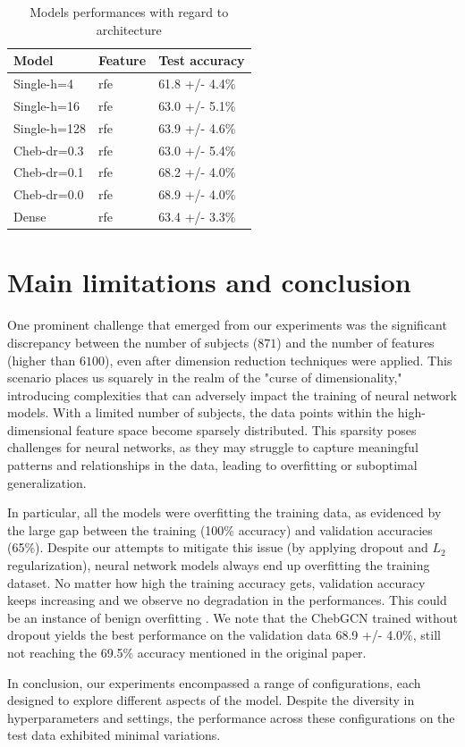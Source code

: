 \begin{table}[H]
	\begin{center}
		\begin{tabular}{lll}
			Model & Feature & Test accuracy \\
			\hline
			Single-h=4 & rfe & 61.8 +/- 4.4\% \\
			Single-h=16 & rfe & 63.0 +/- 5.1\% \\
			Single-h=128 & rfe & 63.9 +/- 4.6\% \\
			Cheb-dr=0.3 & rfe & 63.0 +/- 5.4\% \\
			Cheb-dr=0.1 & rfe & 68.2 +/- 4.0\% \\
			Cheb-dr=0.0 & rfe & 68.9 +/- 4.0\% \\
			Dense & rfe & 63.4 +/- 3.3\% \\
		\end{tabular}
	\end{center}
	\caption{Models performances with regard to architecture}
	\label{table:dependance_on_architecture}
\end{table}




\section{Main limitations and conclusion}


One prominent challenge that emerged from our experiments was the significant discrepancy between the number of subjects ($871$) and the number of features (higher than $6100$), even after dimension reduction techniques were applied. This scenario places us squarely in the realm of the "curse of dimensionality," introducing complexities that can adversely impact the training of neural network models. With a limited number of subjects, the data points within the high-dimensional feature space become sparsely distributed. This sparsity poses challenges for neural networks, as they may struggle to capture meaningful patterns and relationships in the data, leading to overfitting or suboptimal generalization.

In particular, all the models were overfitting the training data, as evidenced by the large gap between the training (100\% accuracy) and validation accuracies (65\%). Despite our attempts to mitigate this issue (by applying dropout and $L_2$ regularization), neural network models always end up overfitting the training dataset. No matter how high the training accuracy gets, validation accuracy keeps increasing and we observe no degradation in the performances. This could be an instance of benign overfitting \cite{Bartlett_2020}. We note that the ChebGCN trained without dropout yields the best performance on the validation data 68.9 +/- 4.0\%, still not reaching the 69.5\% accuracy
mentioned in the original paper.


In conclusion, our experiments encompassed a range of configurations, each designed to explore different aspects of the model. Despite the diversity in hyperparameters and settings, the performance across these configurations on the test data exhibited minimal variations.